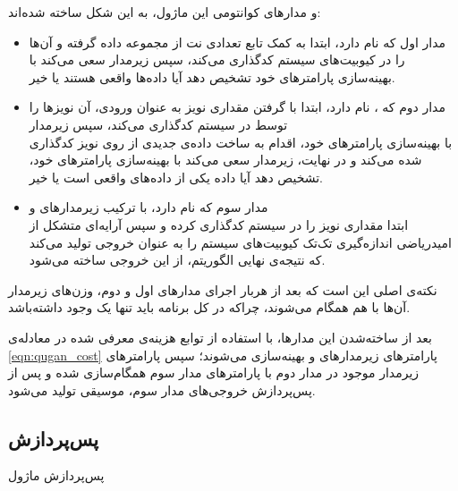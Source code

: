 و مدارهای کوانتومی این ماژول، به این شکل ساخته شده‌اند:
\begin{itemize}
    \item
    مدار اول که
    نام دارد،
    ابتدا به کمک تابع
    تعدادی نت از مجموعه داده گرفته و آن‌ها را در کیوبیت‌های سیستم کدگذاری می‌کند، سپس زیرمدار
    سعی می‌کند با بهینه‌سازی پارامترهای خود تشخیص دهد آیا داده‌ها واقعی هستند یا خیر.
    
    \item
    مدار دوم که
    ،
    نام دارد، ابتدا با گرفتن مقداری نویز به عنوان ورودی، آن نویزها را توسط
    در سیستم کدگذاری می‌کند، سپس زیرمدار \\
    با بهینه‌سازی پارامترهای خود، اقدام به ساخت داده‌ی جدیدی از روی نویز کدگذاری شده می‌کند و در نهایت، زیرمدار
    سعی می‌کند با بهینه‌سازی پارامترهای خود، تشخیص دهد آیا داده یکی از داده‌های واقعی است یا خیر.
    
    \item
    مدار سوم که
    نام دارد، با ترکیب زیرمدار‌های
    و \\
    ابتدا مقداری نویز را در سیستم کدگذاری کرده و سپس آرایه‌ای متشکل از امیدریاضی اندازه‌گیری تک‌تک کیوبیت‌های سیستم را به عنوان خروجی تولید می‌کند که نتیجه‌ی نهایی الگوریتم، از این خروجی ساخته می‌شود.
    
\end{itemize}
نکته‌ی اصلی این است که بعد از هربار اجرای مدارهای اول و دوم، وزن‌های زیرمدار
آن‌ها با هم همگام می‌شوند، چراکه در کل برنامه باید تنها یک
وجود داشته‌باشد.

بعد از ساخته‌شدن این مدارها، با استفاده از توابع هزینه‌ی معرفی شده در معادله‌ی
\ref{eqn:qugan_cost}
پارامترهای زیرمدارهای 
و
بهینه‌سازی می‌شوند؛ سپس پارامترهای زیرمدار
موجود در مدار دوم با پارامترهای مدار سوم همگام‌سازی شده و پس از پس‌پردازش خروجی‌های مدار سوم، موسیقی تولید می‌شود.

\subsection{پس‌پردازش}

\begin{algorithm}[t]
\caption{پس‌پردازش ماژول } \label{alg:quganpost}
\end{algorithm}

